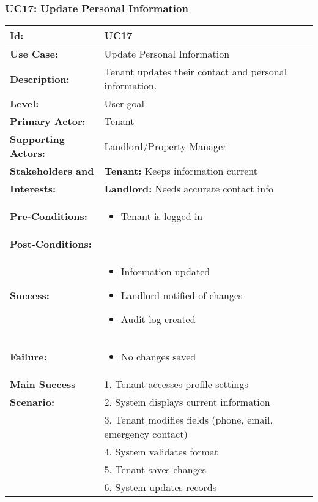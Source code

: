 \documentclass[12pt]{article}
\begin{document}
\subsubsection{UC17: Update Personal Information}

\begin{tabular}{|p{3cm}|p{11cm}|}
\hline
\textbf{Id:} & UC17 \\
\hline
\textbf{Use Case:} & Update Personal Information \\
\hline
\textbf{Description:} & Tenant updates their contact and personal information. \\
\hline
\textbf{Level:} & User-goal \\
\hline
\textbf{Primary Actor:} & Tenant \\
\hline
\textbf{Supporting Actors:} & Landlord/Property Manager \\
\hline
\textbf{Stakeholders and} & \textbf{Tenant:} Keeps information current \\
\textbf{Interests:} & \textbf{Landlord:} Needs accurate contact info \\
\hline
\textbf{Pre-Conditions:} & 
\begin{itemize}
    \item Tenant is logged in
\end{itemize} \\
\hline
\textbf{Post-Conditions:} & \\
\textbf{Success:} & 
\begin{itemize}
    \item Information updated
    \item Landlord notified of changes
    \item Audit log created
\end{itemize} \\
\textbf{Failure:} & 
\begin{itemize}
    \item No changes saved
\end{itemize} \\
\hline
\textbf{Main Success} & 1. Tenant accesses profile settings \\
\textbf{Scenario:} & 2. System displays current information \\
& 3. Tenant modifies fields (phone, email, emergency contact) \\
& 4. System validates format \\
& 5. Tenant saves changes \\
& 6. System updates records \\

\end{tabular}
\end{document}
